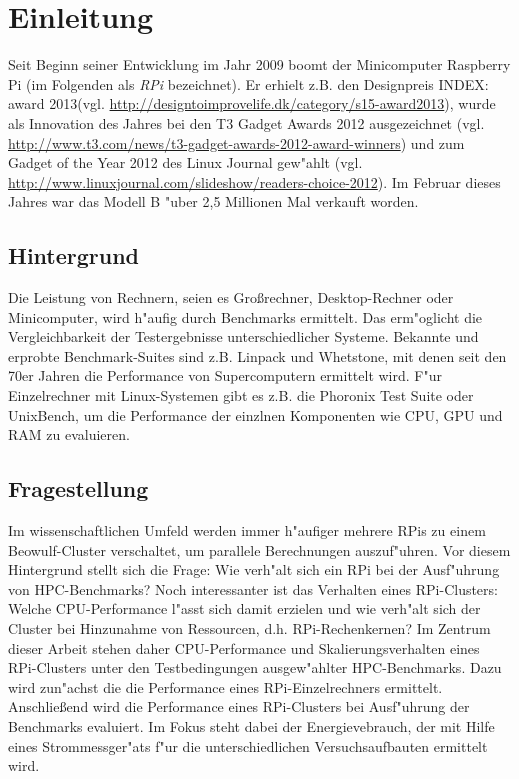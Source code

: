\chapter{Einleitung}\label{Kap1}


Seit Beginn seiner Entwicklung im Jahr 2009 boomt der Minicomputer Raspberry Pi (im Folgenden als \textit{RPi} bezeichnet). Er erhielt z.B. den Designpreis INDEX: award 2013\newline(vgl. \url{http://designtoimprovelife.dk/category/s15-award2013}), wurde als Innovation des Jahres bei den T3 Gadget Awards 2012 ausgezeichnet (vgl. \url{http://www.t3.com/news/t3-gadget-awards-2012-award-winners}) und zum Gadget of the Year 2012 des Linux Journal gew"ahlt (vgl. \url{http://www.linuxjournal.com/slideshow/readers-choice-2012}). Im Februar dieses Jahres war das Modell B "uber 2,5 Millionen Mal verkauft worden. 

\section{Hintergrund}\label{Hintergrund}

Die Leistung von Rechnern, seien es Gro\ss rechner, Desktop-Rechner oder Minicomputer, wird h"aufig durch Benchmarks ermittelt. Das erm"oglicht die Vergleichbarkeit der Testergebnisse unterschiedlicher Systeme. Bekannte und erprobte Benchmark-Suites sind z.B. Linpack und Whetstone, mit denen seit den 70er Jahren die Performance von Supercomputern ermittelt wird. F"ur Einzelrechner mit Linux-Systemen gibt es z.B. die Phoronix Test Suite oder UnixBench, um die Performance der einzlnen Komponenten wie CPU, GPU und RAM zu evaluieren. 

\section{Fragestellung}\label{Fragestellung}

Im wissenschaftlichen Umfeld werden immer h"aufiger mehrere RPis zu einem Beowulf-Cluster %
verschaltet, um parallele Berechnungen auszuf"uhren. Vor diesem Hintergrund stellt sich die Frage: Wie verh"alt sich ein RPi bei der Ausf"uhrung von HPC-Benchmarks? Noch interessanter ist das Verhalten eines RPi-Clusters: Welche CPU-Performance l"asst sich damit erzielen und wie verh"alt sich der Cluster bei Hinzunahme von Ressourcen, d.h. RPi-Rechenkernen? Im Zentrum dieser Arbeit stehen daher CPU-Performance und Skalierungsverhalten eines RPi-Clusters unter den Testbedingungen ausgew"ahlter HPC-Benchmarks. Dazu wird zun"achst die die Performance eines RPi-Einzelrechners ermittelt. Anschlie\ss end wird die Performance eines RPi-Clusters bei Ausf"uhrung der Benchmarks evaluiert. Im Fokus steht dabei der Energievebrauch, der mit Hilfe eines Strommessger"ats f"ur die unterschiedlichen Versuchsaufbauten ermittelt wird. 

